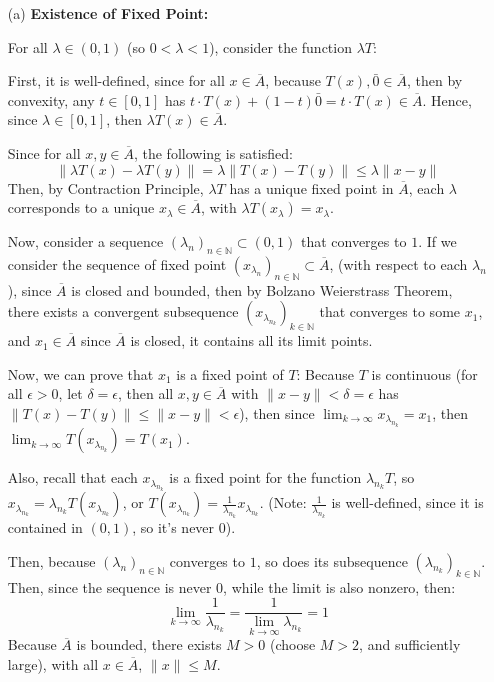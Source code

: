 \documentclass{article}
\begin{document}
\begin{itemize}
    \item[(a)] \textbf{Existence of Fixed Point:}
    
    For all $\lambda\in (0,1)$ (so $0<\lambda<1$), consider the function $\lambda T$: 
    
    First, it is well-defined, since for all $x\in \overline{A}$, because $T(x),\bar{0}\in \overline{A}$,
    then by convexity, any $t\in [0,1]$ has $t\cdot T(x)+(1-t)\bar{0} = t\cdot T(x)\in \overline{A}$.
    Hence, since $\lambda \in [0,1]$, then $\lambda T(x)\in \overline{A}$.

    \hfil
    
    Since for all $x,y\in \overline{A}$, the following is satisfied:
    $$\|\lambda T(x)-\lambda T(y)\| = \lambda\|T(x)-T(y)\| \leq \lambda \|x-y\|$$
    Then, by Contraction Principle, $\lambda T$ has a unique fixed point in $\overline{A}$, each $\lambda$ corresponds to a unique $x_\lambda\in \overline{A}$, with $\lambda T(x_\lambda)=x_\lambda$.

    \hfil

    Now, consider a sequence $(\lambda_n)_{n\in\mathbb{N}}\subset (0,1)$ that converges to $1$. If we consider the sequence of fixed point $(x_{\lambda_n})_{n\in\mathbb{N}}\subset \overline{A}$,
    (with respect to each $\lambda_n$), since $\overline{A}$ is closed and bounded, then by Bolzano Weierstrass Theorem, 
    there exists a convergent subsequence $(x_{\lambda_{n_k}})_{k\in\mathbb{N}}$ that converges to some $x_1$, and $x_1\in\overline{A}$ since $\overline{A}$ is closed, it contains all its limit points.

    \hfil

    Now, we can prove that $x_1$ is a fixed point of $T$: Because $T$ is continuous (for all $\epsilon>0$, let $\delta=\epsilon$, then all $x,y\in \overline{A}$ with $\|x-y\|<\delta=\epsilon$ has $\|T(x)-T(y)\|\leq \|x-y\|<\epsilon$),
    then since $\lim_{k\rightarrow\infty}x_{\lambda_{n_k}}=x_1$, then $\lim_{k\rightarrow\infty}T(x_{\lambda_{n_k}})=T(x_1)$.

    Also, recall that each $x_{\lambda_{n_k}}$ is a fixed point for the function $\lambda_{n_k}T$, so $x_{\lambda_{n_k}}=\lambda_{n_k}T(x_{\lambda_{n_k}})$, or $T(x_{\lambda_{n_k}})=\frac{1}{\lambda_{n_k}}x_{\lambda_{n_k}}$.
    (Note: $\frac{1}{\lambda_{n_k}}$ is well-defined, since it is contained in $(0,1)$, so it's never $0$).

    Then, because $(\lambda_n)_{n\in\mathbb{N}}$ converges to $1$, so does its subsequence $(\lambda_{n_k})_{k\in\mathbb{N}}$. Then, since the sequence is never $0$, while the limit is also nonzero, then:
    $$\lim_{k\rightarrow\infty}\frac{1}{\lambda_{n_k}}=\frac{1}{\lim_{k\rightarrow\infty}\lambda_{n_k}} = 1$$
    Because $\overline{A}$ is bounded, there exists $M>0$ (choose $M>2$, and sufficiently large), with all $x\in\overline{A}$, $\|x\|\leq M$.
    

\end{itemize}
\end{document}
